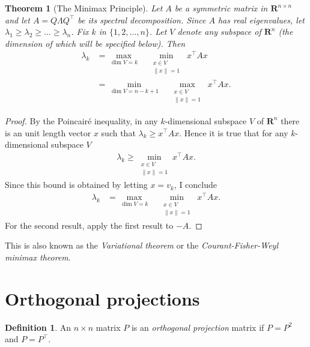 \documentclass[]{article}
\theoremstyle{plain}
\newtheorem{thm}{Theorem}
\theoremstyle{definition}
\newtheorem{defn}{Definition}
\theoremstyle{remark}
\newcommand{\reals}{\mathbf{R}}
\begin{document}
\begin{thm}[The Minimax Principle]
Let $A$ be a symmetric matrix in $\reals^{n \times n}$ and let
$A = Q\Lambda Q^\top$ be its spectral decomposition.  Since $A$
has real eigenvalues, let $\lambda_1 \ge \lambda_2 \ge \dots \ge \lambda_n$.
Fix $k$ in $\{1, 2, \dots, n\}$.
Let $V$ denote any subspace of $\reals^n$ (the dimension of which will be
specified below).  Then
\begin{align*}
\lambda_k &= \max_{\dim{V} = k} \quad \min_{\substack{x \in V \\ \|x\|=1}} \; x^\top A x \\
  &= \min_{\dim{V} = n-k+1} \quad \max_{\substack{x \in V \\ \|x\|=1}} \; x^\top A x.
\end{align*}
\end{thm}
\begin{proof}
By the Poincair\'{e} inequality, in any $k$-dimensional subspace $V$ of
$\reals^n$ there is an unit length vector $x$ such that
$\lambda_k \ge x^\top A x$.  Hence it is true that for any $k$-dimensional
subspace $V$
\begin{align*}
\lambda_k \ge \min_{\substack{x \in V \\ \|x\|=1}} x^\top A x.
\end{align*}
Since this bound is obtained by letting $x = v_k$, I conclude
\begin{align*}
\lambda_k &= \max_{\dim{V} = k} \quad \min_{\substack{x \in V \\ \|x\|=1}} \; x^\top A x.
\end{align*}
For the second result, apply the first result to $-A$.
\end{proof}

This is also known as the \emph{Variational theorem} or the
\emph{Courant-Fisher-Weyl minimax theorem}.

\section{Orthogonal projections}\label{projections}



\begin{defn}
An $n \times n$ matrix $P$ is an \emph{orthogonal projection} matrix
if $P=P^2$ and $P=P^\top$.
\end{defn}
\end{document}
